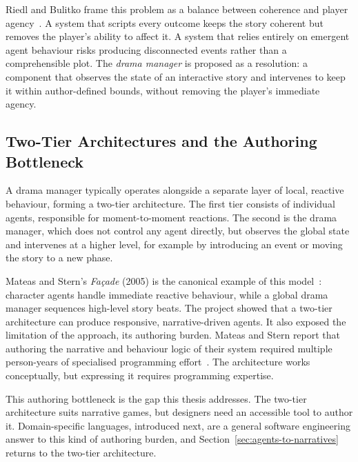 Riedl and Bulitko frame this problem as a balance between coherence and player agency~\cite{Riedl2013}. A system that scripts every outcome keeps the story coherent but removes the player's ability to affect it. A system that relies entirely on emergent agent behaviour risks producing disconnected events rather than a comprehensible plot. The \textit{drama manager} is proposed as a resolution: a component that observes the state of an interactive story and intervenes to keep it within author-defined bounds, without removing the player's immediate agency.
 
\subsection{Two-Tier Architectures and the Authoring Bottleneck}
\label{sec:two-tier-bottleneck}
 
A drama manager typically operates alongside a separate layer of local, reactive behaviour, forming a two-tier architecture. The first tier consists of individual agents, responsible for moment-to-moment reactions. The second is the drama manager, which does not control any agent directly, but observes the global state and intervenes at a higher level, for example by introducing an event or moving the story to a new phase.
 
Mateas and Stern's \textit{Fa\c{c}ade} (2005) is the canonical example of this model~\cite{Mateas2005}: character agents handle immediate reactive behaviour, while a global drama manager sequences high-level story beats. The project showed that a two-tier architecture can produce responsive, narrative-driven agents. It also exposed the limitation of the approach, its authoring burden. Mateas and Stern report that authoring the narrative and behaviour logic of their system required multiple person-years of specialised programming effort~\cite{Mateas2005}. The architecture works conceptually, but expressing it requires programming expertise.
 
This authoring bottleneck is the gap this thesis addresses. The two-tier architecture suits narrative games, but designers need an accessible tool to author it. Domain-specific languages, introduced next, are a general software engineering answer to this kind of authoring burden, and Section~\ref{sec:agents-to-narratives} returns to the two-tier architecture.
 
 
